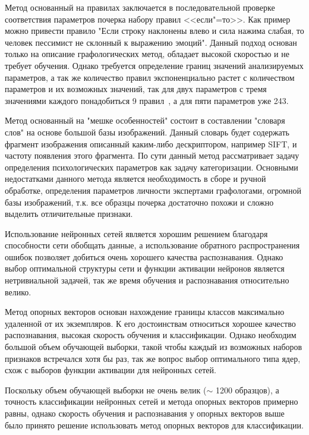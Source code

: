 Метод основанный на правилах заключается в последовательной проверке соответствия параметров почерка набору правил <<если"=то>>. Как пример можно привести правило "Если строку наклонены влево и сила нажима слабая, то человек пессимист не склонный к выражению эмоций". Данный подход основан только на описание графологических метод, обладает высокой скоростью и не требует обучения. Однако требуется определение границ значений анализируемых параметров, а так же количество правил экспоненциально растет с количеством параметров и их возможных значений, так для двух параметров с тремя значениями каждого понадобиться 9 правил~\cite{champa_ananda_kumar_rule_base}, а для пяти параметров уже 243.

Метод основанный на "мешке особенностей" состоит в составлении "словаря слов" на основе большой базы изображений. Данный словарь будет содержать фрагмент изображения описанный каким-либо дескриптором, например SIFT, и частоту появления этого фрагмента. По сути данный метод рассматривает задачу определения психологических параметров как задачу категоризации. Основными недостатками данного метода является необходимость в сборе и ручной обработке, определения параметров личности экспертами графологами, огромной базы изображений, т.к. все образцы почерка достаточно похожи и сложно выделить отличительные признаки.

Использование нейронных сетей является хорошим решением благодаря способности сети обобщать данные, а использование обратного распространения ошибок позволяет добиться очень хорошего качества распознавания. Однако выбор оптимальной структуры сети и функции активации нейронов является нетривиальной задачей, так же время обучения и распознавания относительно велико.

Метод опорных векторов основан нахождение границы классов максимально удаленной от их экземпляров. К его достоинствам относиться хорошее качество распознавания, высокая скорость обучения и классификации. Однако необходим большой объем обучающей выборки, такой чтобы каждый из возможных наборов признаков встречался хотя бы раз, так же вопрос выбор оптимального типа ядер, схож с выборов функции активации для нейронных сетей.

Поскольку объем обучающей выборки не очень велик ($\sim$ 1200 образцов), а точность классификации нейронных сетей и метода опорных векторов примерно равны, однако скорость обучения и распознавания у опорных векторов выше было принято решение использовать метод опорных векторов для классификации.

